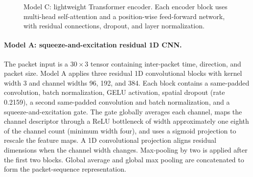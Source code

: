 \documentclass[conference]{IEEEtran}
\begin{document}
\begin{figure}[t]
\centering
{}
\caption{Model C: lightweight Transformer encoder. Each encoder block uses multi-head self-attention and a position-wise feed-forward network, with residual connections, dropout, and layer normalization.}
\label{fig:model_c}
\end{figure}

\paragraph{Model A: squeeze-and-excitation residual 1D CNN.}
The packet input is a $30\times3$ tensor containing inter-packet time, direction, and packet size. Model A applies three residual 1D convolutional blocks with kernel width 3 and channel widths 96, 192, and 384. Each block contains a same-padded convolution, batch normalization, GELU activation, spatial dropout (rate 0.2159), a second same-padded convolution and batch normalization, and a squeeze-and-excitation gate. The gate globally averages each channel, maps the channel descriptor through a ReLU bottleneck of width approximately one eighth of the channel count (minimum width four), and uses a sigmoid projection to rescale the feature maps. A 1D convolutional projection aligns residual dimensions when the channel width changes. Max-pooling by two is applied after the first two blocks. Global average and global max pooling are concatenated to form the packet-sequence representation.
\end{document}
